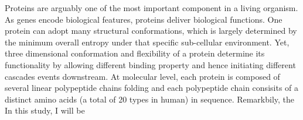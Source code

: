 Proteins are arguably one of the most important component in a living organism. As genes encode biological features, proteins deliver biological functions. One protein can adopt many structural conformations, which is largely determined by the minimum overall entropy under that specific sub-cellular environment. Yet, three dimensional conformation and flexibility of a protein determine its functionality by allowing different binding property and hence initiating different cascades events downstream. At molecular level, each protein is composed of several linear polypeptide chains folding and each polypeptide chain consisits of a distinct amino acids (a total of 20 types in human) in sequence. Remarkbily, the  In this study, I will be 